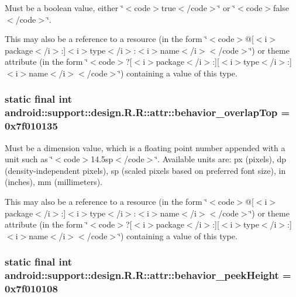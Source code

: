 Must be a boolean value, either \char`\"{}$<$code$>$true$<$/code$>$\char`\"{} or \char`\"{}$<$code$>$false$<$/code$>$\char`\"{}. 

This may also be a reference to a resource (in the form \char`\"{}$<$code$>$@\mbox{[}$<$i$>$package$<$/i$>$:\mbox{]}$<$i$>$type$<$/i$>$:$<$i$>$name$<$/i$>$$<$/code$>$\char`\"{}) or theme attribute (in the form \char`\"{}$<$code$>$?\mbox{[}$<$i$>$package$<$/i$>$:\mbox{]}\mbox{[}$<$i$>$type$<$/i$>$:\mbox{]}$<$i$>$name$<$/i$>$$<$/code$>$\char`\"{}) containing a value of this type. \hypertarget{classandroid_1_1support_1_1design_1_1_r_1_1attr_ab1dabc4ea959178a86b3cfa6fb27391}{
\subsubsection[{behavior\_\-overlapTop}]{\setlength{\rightskip}{0pt plus 5cm}static final int android::support::design.R.R::attr::behavior\_\-overlapTop = 0x7f010135}}
\label{classandroid_1_1support_1_1design_1_1_r_1_1attr_ab1dabc4ea959178a86b3cfa6fb27391}


Must be a dimension value, which is a floating point number appended with a unit such as \char`\"{}$<$code$>$14.5sp$<$/code$>$\char`\"{}. Available units are: px (pixels), dp (density-independent pixels), sp (scaled pixels based on preferred font size), in (inches), mm (millimeters). 

This may also be a reference to a resource (in the form \char`\"{}$<$code$>$@\mbox{[}$<$i$>$package$<$/i$>$:\mbox{]}$<$i$>$type$<$/i$>$:$<$i$>$name$<$/i$>$$<$/code$>$\char`\"{}) or theme attribute (in the form \char`\"{}$<$code$>$?\mbox{[}$<$i$>$package$<$/i$>$:\mbox{]}\mbox{[}$<$i$>$type$<$/i$>$:\mbox{]}$<$i$>$name$<$/i$>$$<$/code$>$\char`\"{}) containing a value of this type. \hypertarget{classandroid_1_1support_1_1design_1_1_r_1_1attr_1d59b1fdcaa219a893f141752e32d77f}{
\subsubsection[{behavior\_\-peekHeight}]{\setlength{\rightskip}{0pt plus 5cm}static final int android::support::design.R.R::attr::behavior\_\-peekHeight = 0x7f010108}}
\label{classandroid_1_1support_1_1design_1_1_r_1_1attr_1d59b1fdcaa219a893f141752e32d77f}



